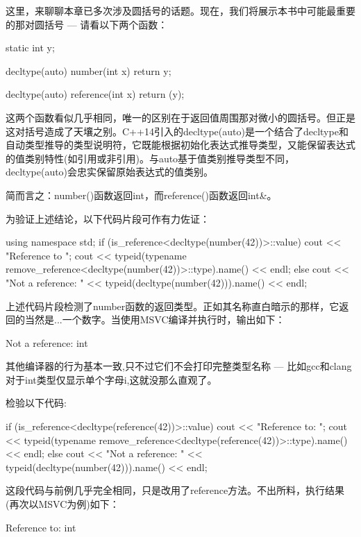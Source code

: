 
这里，来聊聊本章已多次涉及圆括号的话题。现在，我们将展示本书中可能最重要的那对圆括号 --- 请看以下两个函数：

\begin{cpp}
static int y;

decltype(auto) number(int x) {
  return y;
}

decltype(auto) reference(int x) {
  return (y);
}
\end{cpp}

这两个函数看似几乎相同，唯一的区别在于返回值周围那对微小的圆括号。但正是这对括号造成了天壤之别。C++14引入的decltype(auto)是一个结合了decltype和自动类型推导的类型说明符，它既能根据初始化表达式推导类型，又能保留表达式的值类别特性(如引用或非引用)。与auto基于值类别推导类型不同，decltype(auto)会忠实保留原始表达式的值类别。

简而言之：number()函数返回int，而reference()函数返回int\&。

为验证上述结论，以下代码片段可作有力佐证：

\begin{cpp}
using namespace std;
if (is_reference<decltype(number(42))>::value) {
  cout << "Reference to ";
  cout << typeid(typename
  remove_reference<decltype(number(42))>::type).name() << endl;
} else {
  cout << "Not a reference: " << typeid(decltype(number(42))).name() << endl;
}
\end{cpp}

上述代码片段检测了number函数的返回类型。正如其名称直白暗示的那样，它返回的当然是...一个数字。当使用MSVC编译并执行时，输出如下：

\begin{shell}
Not a reference: int
\end{shell}

其他编译器的行为基本一致,只不过它们不会打印完整类型名称 --- 比如gcc和clang对于int类型仅显示单个字母i,这就没那么直观了。

检验以下代码:

\begin{cpp}
if (is_reference<decltype(reference(42))>::value) {
  cout << "Reference to: ";
  cout << typeid(typename
  remove_reference<decltype(reference(42))>::type).name() << endl;
} else {
  cout << "Not a reference: " << typeid(decltype(number(42))).name() << endl;
}
\end{cpp}

这段代码与前例几乎完全相同，只是改用了reference方法。不出所料，执行结果(再次以MSVC为例)如下：

\begin{shell}
Reference to: int
\end{shell}

